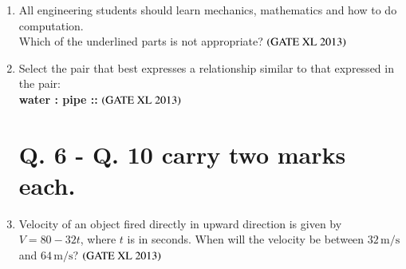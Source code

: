 \documentclass[journal]{IEEEtran}
\begin{document}
\begin{enumerate}
\item 
All engineering students should learn mechanics, mathematics and how to do computation.\\
Which of the underlined parts is not appropriate? \hfill $\left(\text{GATE XL 2013}\right)$
\begin{enumerate}
\end{enumerate}


\item
Select the pair that best expresses a relationship similar to that expressed in the pair: \\
\textbf{water : pipe ::} \hfill $\left(\text{GATE XL 2013}\right)$
\begin{enumerate}
\end{enumerate}

\section*{Q. 6 - Q. 10 carry two marks each.}

\item  
Velocity of an object fired directly in upward direction is given by $V = 80 - 32t$, where $t$  is in seconds. When will the velocity be between $32\,\mathrm{m/s}$ and $64\,\mathrm{m/s}$? \hfill $\left(\text{GATE XL 2013}\right)$
\begin{enumerate}
\end{enumerate}


\end{enumerate}
\end{document}
